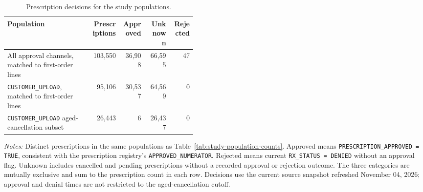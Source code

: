 \begin{table}[htbp]
\centering
\caption{Prescription decisions for the study populations.}
\label{tab:study-population-prescription-decisions}
\small
\begin{tabular}{@{}>{\raggedright\arraybackslash}p{0.45\linewidth}rrrr@{}}
\toprule
Population & Prescriptions & Approved & Unknown & Rejected \\
\midrule

All approval channels, matched to first-order lines & 103,550 & 36,908 & 66,595 & 47 \\

\texttt{CUSTOMER\_UPLOAD}, matched to first-order lines & 95,106 & 30,537 & 64,569 & 0 \\

\texttt{CUSTOMER\_UPLOAD} aged-cancellation subset & 26,443 & 6 & 26,437 & 0 \\
\bottomrule
\end{tabular}

\begin{minipage}{\linewidth}
\footnotesize
\textit{Notes:} Distinct prescriptions in the same populations as
Table~\ref{tab:study-population-counts}. Approved means
\texttt{PRESCRIPTION\_APPROVED = TRUE}, consistent with the prescription registry's
\texttt{APPROVED\_NUMERATOR}. Rejected means current \texttt{RX\_STATUS = DENIED}
without an approval flag. Unknown includes cancelled and pending prescriptions
without a recorded approval or rejection outcome. The three categories are
mutually exclusive and sum to the prescription count in each row.
Decisions use the current source snapshot refreshed November 04, 2026;
approval and denial times are not restricted to the aged-cancellation cutoff.
\end{minipage}
\end{table}